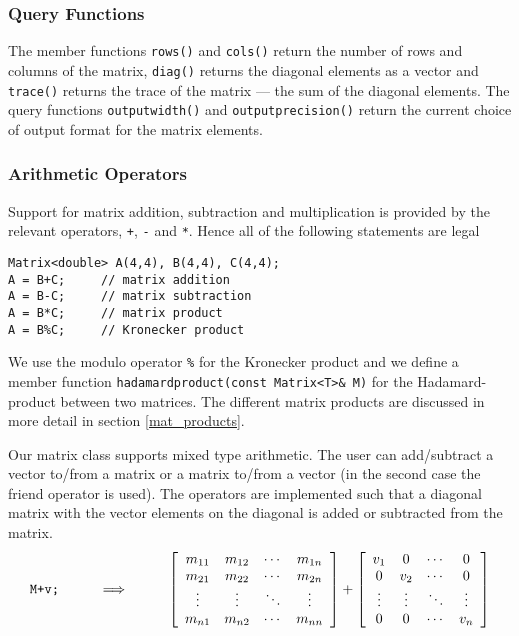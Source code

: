 \subsubsection{Query Functions}

The member functions \verb+rows()+ and \verb+cols()+ return the
number of rows and columns of the matrix, \verb+diag()+ returns
the diagonal elements as a vector and \verb+trace()+ returns the
trace of the matrix --- the sum of the diagonal elements. The
query functions \verb+outputwidth()+ and \verb+outputprecision()+
return the current choice of output format for the matrix elements.


\subsubsection{Arithmetic Operators}

Support for matrix addition, subtraction and multiplication is provided
by the relevant operators, \verb&+&, \verb+-+ and \verb+*+. 
Hence all of the following statements are legal
{\footnotesize \begin{verbatim}
Matrix<double> A(4,4), B(4,4), C(4,4);
A = B+C;     // matrix addition
A = B-C;     // matrix subtraction
A = B*C;     // matrix product
A = B%C;     // Kronecker product
\end{verbatim}}
We use the modulo operator
\verb+%+ for the Kronecker product and we define a member function
\verb+hadamardproduct(const Matrix<T>& M)+ for the Hadamard-product
between two matrices. The different matrix products are discussed in more
detail in section \ref{mat_products}.

Our matrix class supports mixed type arithmetic. The user can add/subtract 
a vector to/from a matrix or a matrix to/from a vector (in the second case 
the friend operator is used). The operators are implemented such that
a diagonal matrix with the vector elements on the diagonal is added or subtracted
from the matrix.
\begin{eqnarray}
\verb&M+v;& \hspace{10mm} \Longrightarrow \hspace{10mm}
\left[ \begin{array}{cccc}
  m_{11} & m_{12} & \cdots & m_{1n} \\
  m_{21} & m_{22} & \cdots & m_{2n} \\
  \vdots & \vdots & \ddots & \vdots \\
  m_{n1} & m_{n2} & \cdots & m_{nn} \\
\end{array} \right] +
\left[ \begin{array}{cccc}
  v_1 & 0 & \cdots & 0 \\
  0 & v_2 & \cdots & 0 \\
  \vdots & \vdots & \ddots & \vdots \\
  0 & 0 & \cdots & v_n \\
\end{array} \right]  
\end{eqnarray}

